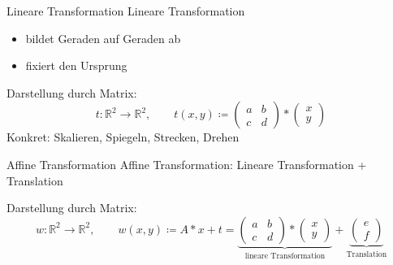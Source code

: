 \documentclass[10pt]{beamer}
\newcommand{\R}{\mathbb{R}}
\begin{document}
\begin{frame}{Lineare Transformation}
  \alert{Lineare Transformation}
  \begin{itemize}
    \item bildet Geraden auf Geraden ab
    \item fixiert den Ursprung
  \end{itemize}
  Darstellung durch Matrix:
  \begin{equation*}
    t: \R^2 \to \R^2, \qquad t(x,y) \coloneqq \begin{pmatrix}
      a & b \\
      c & d
    \end{pmatrix} * \begin{pmatrix}
      x \\ y
    \end{pmatrix}
  \end{equation*}
  Konkret: Skalieren, Spiegeln, Strecken, Drehen
\end{frame}

\begin{frame}{Affine Transformation}
  \alert{Affine Transformation}: Lineare Transformation + Translation
  
  Darstellung durch Matrix:
  \begin{equation*}
    w: \R^2 \to \R^2, \qquad w(x,y) \coloneqq A*x + t = \underbrace{\begin{pmatrix}
      a & b \\
      c & d
    \end{pmatrix} * \begin{pmatrix}
      x \\ y
    \end{pmatrix}}_{\text{lineare Transformation}} + \underbrace{\begin{pmatrix}
      e \\ f
    \end{pmatrix}}_{\text{Translation}}
  \end{equation*}
\end{frame}
\end{document}
